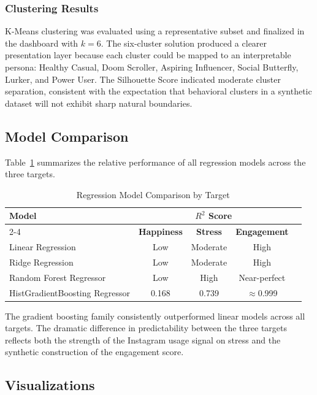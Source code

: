 \documentclass[12pt,a4paper]{article}
\begin{document}
\subsubsection{Clustering Results}
 
K-Means clustering was evaluated using a representative subset and finalized in the dashboard with $k = 6$. The six-cluster solution produced a clearer presentation layer because each cluster could be mapped to an interpretable persona: Healthy Casual, Doom Scroller, Aspiring Influencer, Social Butterfly, Lurker, and Power User. The Silhouette Score indicated moderate cluster separation, consistent with the expectation that behavioral clusters in a synthetic dataset will not exhibit sharp natural boundaries.
 
 
\subsection{Model Comparison}
 
Table~\ref{tab:model_comparison} summarizes the relative performance of all regression models across the three targets.
 
\begin{table}[H]
\centering
\caption{Regression Model Comparison by Target}
\label{tab:model_comparison}
\begin{tabular}{lcccc}
\toprule
\textbf{Model} & \multicolumn{3}{c}{\textbf{$R^2$ Score}} \\
\cmidrule(lr){2-4}
 & \textbf{Happiness} & \textbf{Stress} & \textbf{Engagement} \\
\midrule
Linear Regression                & Low   & Moderate & High \\
Ridge Regression                 & Low   & Moderate & High \\
Random Forest Regressor          & Low   & High     & Near-perfect \\
HistGradientBoosting Regressor   & 0.168 & 0.739    & $\approx$0.999 \\
\bottomrule
\end{tabular}
\end{table}
 
The gradient boosting family consistently outperformed linear models across all targets. The dramatic difference in predictability between the three targets reflects both the strength of the Instagram usage signal on stress and the synthetic construction of the engagement score.

\newpage

\subsection{Visualizations}
 
\end{document}
